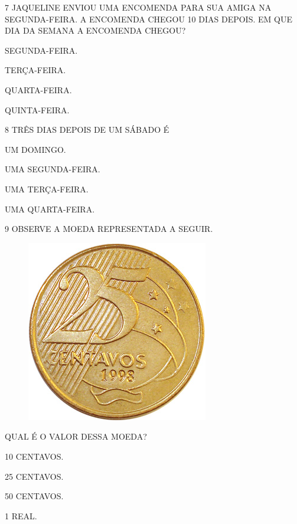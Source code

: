 \num{7} JAQUELINE ENVIOU UMA ENCOMENDA PARA SUA AMIGA NA SEGUNDA-FEIRA. A ENCOMENDA CHEGOU 10 DIAS DEPOIS. EM QUE DIA
DA SEMANA A ENCOMENDA CHEGOU?

\begin{multicols}{2}
\begin{escolha}[itemsep=0pt]
\item SEGUNDA-FEIRA.

\item TERÇA-FEIRA.

\item QUARTA-FEIRA.

\item QUINTA-FEIRA.
\end{escolha}
\end{multicols}

\num{8} TRÊS DIAS DEPOIS DE UM SÁBADO É

\begin{escolha}[itemsep=0pt]
\item UM DOMINGO.

\item UMA SEGUNDA-FEIRA.

\item UMA TERÇA-FEIRA.

\item UMA QUARTA-FEIRA.
\end{escolha}

\num{9} OBSERVE A MOEDA REPRESENTADA A SEGUIR.

\begin{figure}[H]
\centering
\includegraphics[width=.2\textwidth]{./media/SAEB_1ANO_MAT_FIGURA132.png}
\end{figure}

QUAL É O VALOR DESSA MOEDA?

\begin{multicols}{2}
\begin{escolha}[itemsep=0pt]
\item 10 CENTAVOS.

\item 25 CENTAVOS.

\item 50 CENTAVOS.

\item 1 REAL.
\end{escolha}
\end{multicols}



